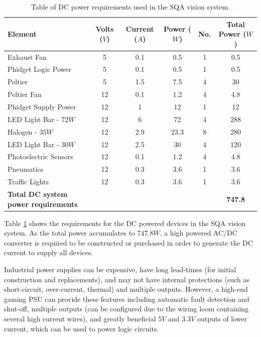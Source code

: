 \documentclass[fleqn,twoside]{article}
\begin{document}
\renewcommand{\arraystretch}{0.8}%
\begin{table}[h]
	\caption{Table of DC power requirements used in the SQA vision system.}
	\label{tab:DC_power_table}
	\begin{tabularx}{\linewidth}{p{6cm}ccccc}
		
		\toprule
		\textbf{Element} & \textbf{Volts ($V$)} & \textbf{Current ($A$)} & \textbf{Power ($W$)} & \textbf{No.} & \textbf{Total Power ($W$)}\\[8pt]
		\midrule
		
		Exhaust Fan & 5 & 0.1 & 0.5 & 1 & 0.5 \\[4pt]
		\midrule
		Phidget Logic Power  & 5 & 0.1 & 0.5 & 1 & 0.5 \\[4pt]
		\midrule
		Peltier & 5 & 1.5 & 7.5 & 4 & 30 \\[4pt]
		\midrule
		Peltier Fan & 12 & 0.1 & 1.2 & 4 & 4.8 \\[4pt]
		\midrule
		Phidget Supply Power & 12 & 1 & 12 & 1 & 12 \\[4pt]
		\midrule
		LED Light Bar - $72W$ & 12 & 6 & 72 & 4 & 288 \\[4pt]
		\midrule
		Halogen - $35W$ & 12 & 2.9 & 23.3 & 8 & 280 \\[4pt]
		\midrule
		LED Light Bar - $30W$ & 12 & 2.5 & 30 & 4 & 120 \\[4pt]
		\midrule
		Photoelectric Sensors & 12 & 0.1 & 1.2 & 4 & 4.8 \\[4pt]
		\midrule
		Pneumatics & 12 & 0.3 & 3.6 & 1 & 3.6 \\[4pt]
		\midrule
		Traffic Lights & 12 & 0.3 & 3.6 & 1 & 3.6 \\[4pt]
		
		\midrule\midrule
		\textbf{Total DC system power requirements} &  &  &  &  & \textbf{747.8}\\[8pt]
		\bottomrule
		
	\end{tabularx}
\end{table}
 

Table \ref{tab:DC_power_table} shows the requirements for the DC powered devices in the SQA vision system. As the total power accumulates to $747.8W$, a high powered AC/DC converter is required to be constructed or purchased in order to generate the DC current to supply all devices.

Industrial power supplies can be expensive, have long lead-times (for initial construction and replacements), and may not have internal protections (such as short-circuit, over-current, thermal) and multiple outputs. However, a high-end gaming PSU can provide these features including automatic fault detection and shut-off, multiple outputs (can be configured due to the wiring loom containing several high current wires), and greatly beneficial $5V$ and $3.3V$ outputs of lower current, which can be used to power logic circuits. 
\end{document}
